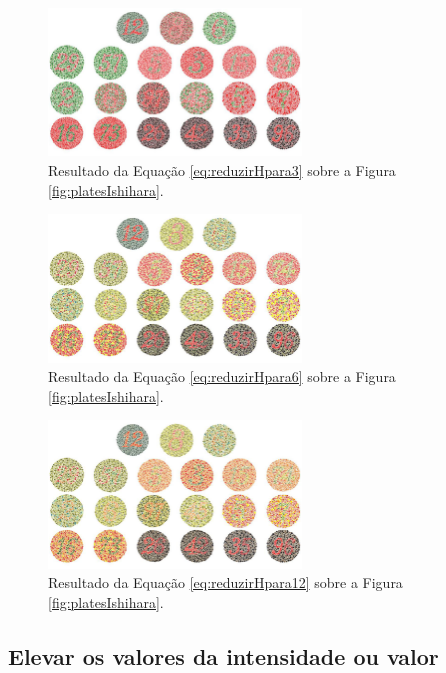 \documentclass[	12pt, Times, openright, twoside, a4paper, english, brazil]{abntex2}
\begin{document}
\begin{figure}[!htb]
\centering \includegraphics[width=0.60\textwidth]{figuraDeslocarH3.jpg}
\caption{Resultado da Equação \ref{eq:reduzirHpara3} sobre a Figura \ref{fig:platesIshihara}. \label{fig:reduzirHpara3}}
\end{figure}

\begin{figure}[!htb]
\centering \includegraphics[width=0.60\textwidth]{figuraDeslocarH6.jpg}
\caption{Resultado da Equação \ref{eq:reduzirHpara6} sobre a Figura \ref{fig:platesIshihara}. \label{fig:reduzirHpara6}}
\end{figure}

\begin{figure}[!htb]
\centering \includegraphics[width=0.60\textwidth]{figuraDeslocarH12.jpg}
\caption{Resultado da Equação \ref{eq:reduzirHpara12} sobre a Figura \ref{fig:platesIshihara}. \label{fig:reduzirHpara12}}
\end{figure}


\subsection{Elevar os valores da intensidade ou valor}
\label{subsec:deslocarVouI}
\end{document}
